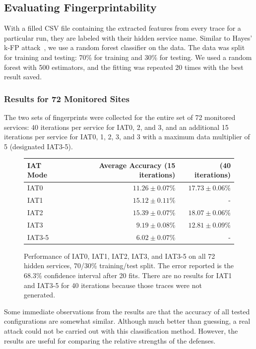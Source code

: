 \documentclass[11pt]{article}
\begin{document}
\subsection{Evaluating Fingerprintability}
With a filled CSV file containing the extracted features from every trace for a particular run, they are labeled with their hidden service name. Similar to Hayes' k-FP attack~\cite{hayes}, we use a random forest classifier on the data. The data was split for training and testing: 70\% for training and 30\% for testing. We used a random forest with 500 estimators, and the fitting was repeated 20 times with the best result saved.

\subsubsection{Results for 72 Monitored Sites}
The two sets of fingerprints were collected for the entire set of 72 monitored services: 40 iterations per service for IAT0, 2, and 3, and an additional 15 iterations per service for IAT0, 1, 2, 3, and 3 with a maximum data multiplier of 5 (designated IAT3-5).

\begin{figure}[ht]
    \centering
    \begin{tabular}{|l|r|r|}
        \hline
        IAT Mode & Average Accuracy (15 iterations) & (40 iterations) \\
        \hline
        IAT0  & $11.26 \pm 0.07$\% & $17.73 \pm 0.06$\%\\
        IAT1  & $15.12 \pm 0.11$\% & -\\
        IAT2  & $15.39 \pm 0.07$\% & $18.07 \pm 0.06$\%\\
        IAT3  & $ 9.19 \pm 0.08$\% & $12.81 \pm 0.09$\%\\
        IAT3-5& $ 6.02 \pm 0.07$\% & -\\
        \hline
    \end{tabular}
    \caption[]{Performance of IAT0, IAT1, IAT2, IAT3, and IAT3-5 on all 72 hidden services, 70/30\% training/test split. The error reported is the 68.3\% confidence interval after 20 fits. There are no results for IAT1 and IAT3-5 for 40 iterations because those traces were not generated.}
\end{figure}

Some immediate observations from the results are that the accuracy of all tested configurations are somewhat similar. Although much better than guessing, a real attack could not be carried out with this classification method. However, the results are useful for comparing the relative strengths of the defenses.
\end{document}
